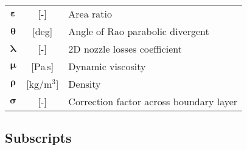 \begin{multicols}{2}
{\begin{xltabular}{\linewidth}{cc>{\raggedright\arraybackslash}X}
		$\boldsymbol{\varepsilon}$ & [-] & Area ratio \\
		$\boldsymbol{\theta}$ & [deg] & Angle of Rao parabolic divergent \\
		$\boldsymbol{\lambda}$ & [-] & 2D nozzle losses coefficient \\
		$\boldsymbol{\mu}$ & [$\textrm{Pa} \, \textrm{s}$] & Dynamic viscosity \\
		$\boldsymbol{\rho}$ & [$\textrm{kg} / \textrm{m}^3$] & Density \\
		$\boldsymbol{\sigma}$ & [-] & Correction factor across boundary layer \\
	\end{xltabular}
	\unskip
	\unpenalty
	\unpenalty}
	\unvbox\ltmcbox
\end{multicols}

\pagebreak

\subsection*{Subscripts}
\label{subsec:subscripts}
\vspace*{-3mm}

